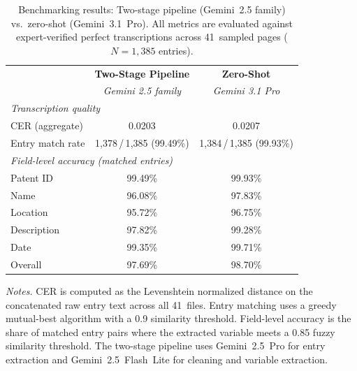 \begin{table}[t]
\centering
\caption{Benchmarking results: Two-stage pipeline (Gemini~2.5 family) vs.\ zero-shot (Gemini~3.1~Pro). All metrics are evaluated against expert-verified perfect transcriptions across 41~sampled pages ($N = 1{,}385$ entries).}
\label{tab:pipeline_comparison}
\begin{tabular}{lcc}
\toprule
 & \textbf{Two-Stage Pipeline} & \textbf{Zero-Shot} \\
 & \textit{Gemini 2.5 family} & \textit{Gemini 3.1 Pro} \\
\midrule
\multicolumn{3}{l}{\textit{Transcription quality}} \\[2pt]
CER (aggregate) & 0.0203 & 0.0207 \\
Entry match rate & 1{,}378\,/\,1{,}385 (99.49\%) & 1{,}384\,/\,1{,}385 (99.93\%) \\
\midrule
\multicolumn{3}{l}{\textit{Field-level accuracy (matched entries)}} \\[2pt]
Patent ID & 99.49\% & 99.93\% \\
Name & 96.08\% & 97.83\% \\
Location & 95.72\% & 96.75\% \\
Description & 97.82\% & 99.28\% \\
Date & 99.35\% & 99.71\% \\
\midrule
Overall & 97.69\% & 98.70\% \\
\bottomrule
\end{tabular}
\begin{tablenotes}
\small
\item \textit{Notes.} CER is computed as the Levenshtein normalized distance on the concatenated raw entry text across all 41~files. Entry matching uses a greedy mutual-best algorithm with a 0.9 similarity threshold. Field-level accuracy is the share of matched entry pairs where the extracted variable meets a 0.85 fuzzy similarity threshold. The two-stage pipeline uses Gemini~2.5~Pro for entry extraction and Gemini~2.5~Flash~Lite for cleaning and variable extraction.
\end{tablenotes}
\end{table}
